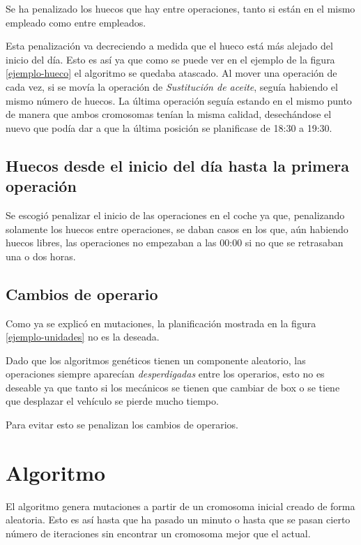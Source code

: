 \documentclass[11pt]{article}
\begin{document}
	Se ha penalizado los huecos que hay entre operaciones, tanto si están en el mismo empleado como entre empleados. 
	
	Esta penalización va decreciendo a medida que el hueco está más alejado del inicio del día. Esto es así ya que como se puede ver en el ejemplo de la figura \ref{ejemplo-hueco} el algoritmo se quedaba atascado. Al mover una operación de cada vez, si se movía la operación de \textit{Sustitución de aceite}, seguía habiendo el mismo número de huecos. La última operación seguía estando en el mismo punto de manera que ambos cromosomas tenían la misma calidad, desechándose el nuevo que podía dar a que la última posición se planificase de 18:30 a 19:30.
	
	\subsection{Huecos desde el inicio del día hasta la primera operación}
	
	Se escogió penalizar el inicio de las operaciones en el coche ya que, penalizando solamente los huecos entre operaciones, se daban casos en los que, aún habiendo huecos libres, las operaciones no empezaban a las 00:00 si no que se retrasaban una o dos horas.
	
	\subsection{Cambios de operario}
	
	Como ya se explicó en mutaciones, la planificación mostrada en la figura \ref{ejemplo-unidades} no es la deseada. 
	
	Dado que los algoritmos genéticos tienen un componente aleatorio, las operaciones siempre aparecían \textit{desperdigadas} entre los operarios, esto no es deseable ya que tanto si los mecánicos se tienen que cambiar de box o se tiene que desplazar el vehículo se pierde mucho tiempo.
	
	Para evitar esto se penalizan los cambios de operarios.
	
	\section{Algoritmo}
	
	El algoritmo genera mutaciones a partir de un cromosoma inicial creado de forma aleatoria. Esto es así hasta que ha pasado un minuto o hasta que se pasan cierto número de iteraciones sin encontrar un cromosoma mejor que el actual. 
	
\end{document}
